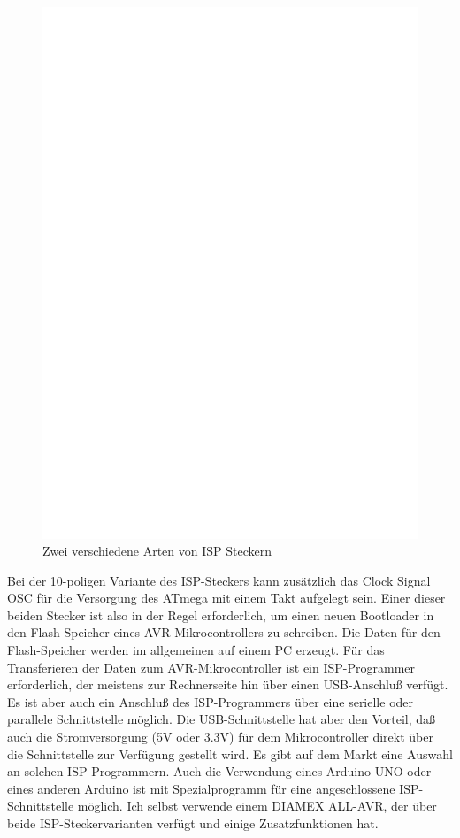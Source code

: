 \begin{figure}[H]
\centering
\includegraphics[width=12cm]{../FIG/ISP.eps}
\caption{Zwei verschiedene Arten von ISP Steckern}
\label{fig:ISP}
\end{figure}

Bei der 10-poligen Variante des ISP-Steckers kann zusätzlich das Clock Signal OSC für die Versorgung
des ATmega mit einem Takt aufgelegt sein.
Einer dieser beiden Stecker ist also in der Regel erforderlich, um einen neuen Bootloader in den
Flash-Speicher eines AVR-Mikrocontrollers zu schreiben. Die Daten für den Flash-Speicher werden
im allgemeinen auf einem PC erzeugt.
Für das Transferieren der Daten zum AVR-Mikrocontroller ist ein ISP-Programmer
erforderlich, der meistens zur Rechnerseite hin über einen USB-Anschluß verfügt. Es ist aber auch
ein Anschluß des ISP-Programmers über eine serielle oder parallele Schnittstelle möglich.
Die USB-Schnittstelle hat aber den Vorteil, daß auch die Stromversorgung (5V oder 3.3V) für
dem Mikrocontroller direkt über die Schnittstelle zur Verfügung gestellt wird.
Es gibt auf dem Markt eine Auswahl an solchen ISP-Programmern.
Auch die Verwendung eines Arduino UNO oder eines anderen Arduino ist mit
Spezialprogramm für eine angeschlossene ISP-Schnittstelle  möglich.
Ich selbst verwende einem DIAMEX ALL-AVR, der über beide 
ISP-Steckervarianten verfügt und einige Zusatzfunktionen hat.

